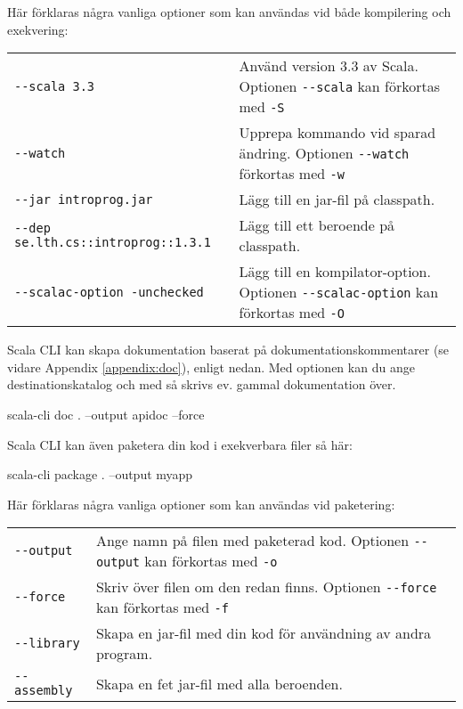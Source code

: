 \noindent Här förklaras några vanliga optioner som kan användas vid både kompilering och exekvering: 
\begin{table}[H]
\begin{tabular}{l p{6.5cm}}
\texttt{-{}-scala 3.3} & Använd version 3.3 av Scala. Optionen \texttt{-{}-scala} kan förkortas med \texttt{-S} \\
\texttt{-{}-watch} & Upprepa kommando vid sparad ändring. Optionen \texttt{-{}-watch} förkortas med \texttt{-w} \\
\texttt{-{}-jar introprog.jar} & Lägg till en jar-fil på classpath. \\
\texttt{-{}-dep se.lth.cs::introprog::1.3.1} & Lägg till ett beroende på classpath. \\
\texttt{-{}-scalac-option -unchecked} & Lägg till en kompilator-option.  Optionen \texttt{-{}-scalac-option} kan förkortas med \texttt{-O}\\
\end{tabular}
\end{table}


\noindent Scala CLI kan skapa dokumentation baserat på dokumentationskommentarer (se vidare Appendix \ref{appendix:doc}), enligt nedan. Med optionen  kan du ange destinationskatalog och med  så skrivs ev. gammal dokumentation över.
\begin{REPLsmall}
scala-cli doc . --output apidoc --force
\end{REPLsmall}

\noindent Scala CLI kan även paketera din kod i exekverbara filer så här:
\begin{REPLsmall}
scala-cli package . --output myapp
\end{REPLsmall}

\noindent Här förklaras några vanliga optioner som kan användas vid paketering: 
\begin{table}[H]
\begin{tabular}{l p{8.5cm}}
\texttt{-{}-output} & Ange namn på filen med paketerad kod. Optionen \texttt{-{}-output} kan förkortas med \texttt{-o}\\
\texttt{-{}-force} & Skriv över filen om den redan finns. Optionen \texttt{-{}-force} kan förkortas med \texttt{-f} \\
\texttt{-{}-library} & Skapa en jar-fil med din kod för användning av andra program.\\
\texttt{-{}-assembly} & Skapa en fet jar-fil med alla beroenden.\\
\end{tabular}
\end{table}



